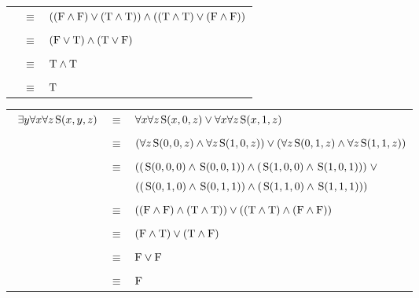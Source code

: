 \documentclass{article}
\newcommand{\True}{\textnormal{T}}
\newcommand{\False}{\textnormal{F}}
\newcommand{\predS}{\hspace{0.05cm} \textnormal{S}}
\newcommand{\predicate}{\predS (x,y,z)}
\begin{document}
\begin{enumerate}
{\begin{center}
\begin{tabular}{ccl}
    & $\equiv$ & $((\False \land \False) \lor (\True \land \True)) \land ((\True \land \True) \lor (\False \land \False))$ \\ \\
    
    & $\equiv$ & $(\False \lor \True) \land (\True \lor \False)$ \\ \\
    
    & $\equiv$ & $\True \land \True$ \\ \\
    
    & $\equiv$ & $\True$ \\ 
    \end{tabular}\end{center}
    }
    {
    \begin{center}\begin{tabular}{ccl}\
    $\exists y \forall x \forall z \predicate$ & $\equiv$ & $\forall x \forall z \predS(x,0,z) \lor \forall x \forall z \predS(x,1,z)$ \\ \\
    
    & $\equiv$ & $(\forall z \predS(0,0,z) \land \forall z \predS(1,0,z)) \lor (\forall z \predS(0,1,z) \land \forall z \predS(1,1,z))$ \\ \\
    
    & $\equiv$ & $((\predS(0,0,0) \land \predS(0,0,1)) \land (\predS(1,0,0) \land \predS(1,0,1))) \hspace{0.1cm} \lor$ \\
    & & $((\predS(0,1,0) \land \predS(0,1,1)) \land (\predS(1,1,0) \land \predS(1,1,1)))$ \\ \\
    
    & $\equiv$ & $((\False \land \False) \land (\True \land \True)) \lor ((\True \land \True) \land (\False \land \False))$ \\ \\
    
    & $\equiv$ & $(\False \land \True) \lor (\True \land \False)$ \\ \\
    
    & $\equiv$ & $\False \lor \False$ \\ \\
    
    & $\equiv$ & $\False$ \\ 
    \end{tabular}\end{center}

}
\end{enumerate}
\end{document}
